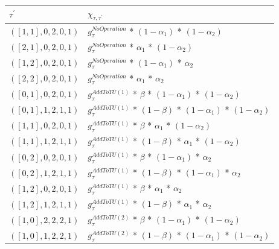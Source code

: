 \begin{table}[H]
	\centering
	\begin{latin}

\begin{tabular}{|l|l|}
	\hline
	\textbf{$\tau^\prime$}          & \textbf{$\chi_{\tau, \tau^{\prime}}$}                            \\ \hline
$([1,1], 0, 2, 0, 1 )$ & $g_{\tau}^{N o O p e r a t i o n}$ * $(1 - \alpha_1)$ * $(1 - \alpha_2)$             \\ \hline
$([2,1], 0, 2, 0, 1 )$ & $g_{\tau}^{N o O p e r a t i o n}$ * $\alpha_1$ * $(1 - \alpha_2)$              \\ \hline
$([1,2], 0, 2, 0, 1 )$ & $g_{\tau}^{N o O p e r a t i o n}$ * $(1 - \alpha_1)$ * $\alpha_2$              \\ \hline
$([2,2], 0, 2, 0, 1 )$ & $g_{\tau}^{N o O p e r a t i o n}$ * $\alpha_1$ * $\alpha_2$                    \\ \hline
$([0,1], 0, 2, 0, 1 )$ & $g_{\tau}^{A d d T o T U ( 1 )}$ * $\beta$ * $(1 - \alpha_1)$ * $(1 - \alpha_2)$       \\ \hline
$([0,1], 1, 2, 1, 1 )$ & $g_{\tau}^{A d d T o T U ( 1 )}$ * $(1 - \beta)$ * $(1 - \alpha_1)$ * $(1 - \alpha_2)$ \\ \hline
$([1,1], 0, 2, 0, 1 )$ & $g_{\tau}^{A d d T o T U ( 1 )}$ * $\beta$ * $\alpha_1$ * $(1 - \alpha_2)$        \\ \hline
$([1,1], 1, 2, 1, 1 )$ & $g_{\tau}^{A d d T o T U ( 1 )}$ * $(1 - \beta)$ * $\alpha_1$ * $(1 - \alpha_2)$  \\ \hline
$([0,2], 0, 2, 0, 1 )$ & $g_{\tau}^{A d d T o T U ( 1 )}$ * $\beta$ * $(1 - \alpha_1)$ * $\alpha_2$        \\ \hline
$([0,2], 1, 2, 1, 1 )$ & $g_{\tau}^{A d d T o T U ( 1 )}$ * $(1 - \beta)$ * $(1 - \alpha_1)$ * $\alpha_2$  \\ \hline
$([1,2], 0, 2, 0, 1 )$ & $g_{\tau}^{A d d T o T U ( 1 )}$ * $\beta$ * $\alpha_1$ * $\alpha_2$              \\ \hline
$([1,2], 1, 2, 1, 1 )$ & $g_{\tau}^{A d d T o T U ( 1 )}$ * $(1 - \beta)$ * $\alpha_1$ * $\alpha_2$        \\ \hline
$([1,0], 2, 2, 2, 1 )$ & $g_{\tau}^{A d d T o T U ( 2 )}$ * $\beta$ * $(1 - \alpha_1)$ * $(1 - \alpha_2)$       \\ \hline
$([1,0], 1, 2, 2, 1 )$ & $g_{\tau}^{A d d T o T U ( 2 )}$ * $(1 - \beta)$ * $(1 - \alpha_1)$ * $(1 - \alpha_2)$ \\ \hline

\end{tabular}
\end{latin}
\end{table}

